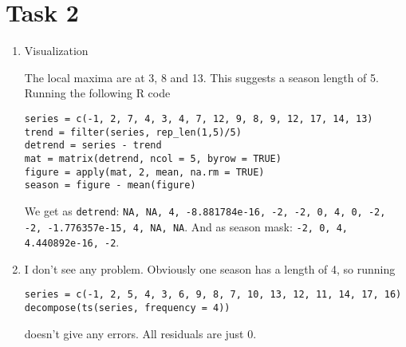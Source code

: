 \documentclass{article}
\begin{document}
	\section*{Task 2}
	\begin{enumerate}[label=(\alph*)]
		\item Visualization
		\begin{center}
		\end{center}
		The local maxima are at 3, 8 and 13. This suggests a season length of 5. Running the following R code
		\begin{lstlisting}[style=R]
series = c(-1, 2, 7, 4, 3, 4, 7, 12, 9, 8, 9, 12, 17, 14, 13)
trend = filter(series, rep_len(1,5)/5)
detrend = series - trend
mat = matrix(detrend, ncol = 5, byrow = TRUE)
figure = apply(mat, 2, mean, na.rm = TRUE)
season = figure - mean(figure)
		\end{lstlisting}
		We get as \texttt{detrend}: \texttt{NA, NA, 4, -8.881784e-16, -2, -2, 0, 4, 0, -2, -2, -1.776357e-15, 4, NA, NA}. And as season mask: \texttt{-2, 0, 4, 4.440892e-16, -2}.
		\item I don't see any problem. Obviously one season has a length of 4, so running
		\begin{lstlisting}[style=R]
series = c(-1, 2, 5, 4, 3, 6, 9, 8, 7, 10, 13, 12, 11, 14, 17, 16)
decompose(ts(series, frequency = 4))
		\end{lstlisting}
		doesn't give any errors. All residuals are just 0.
	\end{enumerate}
	
\end{document}
